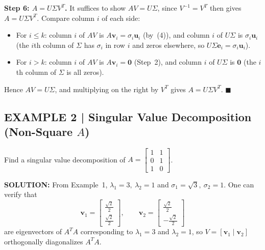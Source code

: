 \documentclass{article}
\begin{document}
\textbf{Step 6: $A = U\Sigma V^T$.}
It suffices to show $AV = U\Sigma$, since $V^{-1}=V^T$ then gives $A = U\Sigma V^T$.
Compare column $i$ of each side:
\begin{itemize}
  \item For $i\le k$: column $i$ of $AV$ is $A\mathbf{v}_i = \sigma_i\mathbf{u}_i$
        (by~(4)), and column $i$ of $U\Sigma$ is $\sigma_i\mathbf{u}_i$ (the $i$th
        column of $\Sigma$ has $\sigma_i$ in row $i$ and zeros elsewhere, so
        $U\Sigma\mathbf{e}_i = \sigma_i\mathbf{u}_i$). \checkmark
  \item For $i>k$: column $i$ of $AV$ is $A\mathbf{v}_i = \mathbf{0}$ (Step~2), and
        column $i$ of $U\Sigma$ is $\mathbf{0}$ (the $i$th column of $\Sigma$ is all
        zeros). \checkmark
\end{itemize}
Hence $AV = U\Sigma$, and multiplying on the right by $V^T$ gives $A = U\Sigma V^T$.
$\blacksquare$

\subsection*{EXAMPLE 2 | Singular Value Decomposition (Non-Square $A$)}

Find a singular value decomposition of $A = \begin{bmatrix}1&1\\0&1\\1&0\end{bmatrix}$.

\textbf{SOLUTION:} From Example~1, $\lambda_1=3,\ \lambda_2=1$ and $\sigma_1=\sqrt{3},\
\sigma_2=1$. One can verify that
\[
  \mathbf{v}_1 = \begin{bmatrix}\tfrac{\sqrt{2}}{2}\\\tfrac{\sqrt{2}}{2}\end{bmatrix},\qquad
  \mathbf{v}_2 = \begin{bmatrix}\tfrac{\sqrt{2}}{2}\\-\tfrac{\sqrt{2}}{2}\end{bmatrix}
\]
are eigenvectors of $A^TA$ corresponding to $\lambda_1=3$ and $\lambda_2=1$, so
$V = [\mathbf{v}_1\mid\mathbf{v}_2]$ orthogonally diagonalizes $A^TA$.
\end{document}
